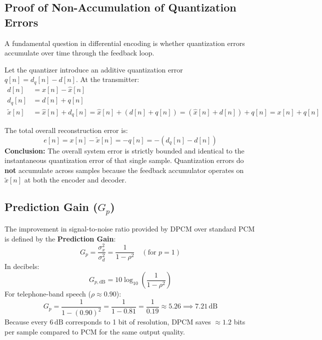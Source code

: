 \documentclass[11pt,a4paper]{article}
\begin{document}
\subsection{Proof of Non-Accumulation of Quantization Errors}
A fundamental question in differential encoding is whether quantization errors accumulate over time through the feedback loop. 

Let the quantizer introduce an additive quantization error $q[n] = d_q[n] - d[n]$. At the transmitter:
\begin{align}
d[n] &= x[n] - \hat{x}[n] \\
d_q[n] &= d[n] + q[n] \\
\tilde{x}[n] &= \hat{x}[n] + d_q[n] = \hat{x}[n] + (d[n] + q[n]) = (\hat{x}[n] + d[n]) + q[n] = x[n] + q[n]
\end{align}

The total overall reconstruction error is:
\begin{equation}
e[n] = x[n] - \tilde{x}[n] = -q[n] = -(d_q[n] - d[n])
\end{equation}
\textbf{Conclusion:} The overall system error is strictly bounded and identical to the instantaneous quantization error of that single sample. Quantization errors do \textbf{not} accumulate across samples because the feedback accumulator operates on $\tilde{x}[n]$ at both the encoder and decoder.

\subsection{Prediction Gain ($G_p$)}
The improvement in signal-to-noise ratio provided by DPCM over standard PCM is defined by the \textbf{Prediction Gain}:
\begin{equation}
G_p = \frac{\sigma_x^2}{\sigma_d^2} = \frac{1}{1 - \rho^2} \quad (\text{for } p = 1)
\end{equation}
In decibels:
\begin{equation}
G_{p,\mathrm{dB}} = 10 \log_{10}\left(\frac{1}{1 - \rho^2}\right)
\end{equation}
For telephone-band speech ($\rho \approx 0.90$):
\begin{equation}
G_p = \frac{1}{1 - (0.90)^2} = \frac{1}{1 - 0.81} = \frac{1}{0.19} \approx 5.26 \implies \mathbf{7.21\,\mathrm{dB}}
\end{equation}
Because every $6\,\mathrm{dB}$ corresponds to 1 bit of resolution, DPCM saves $\approx 1.2$ bits per sample compared to PCM for the same output quality.
\end{document}
